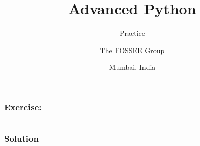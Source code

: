 \documentclass[14pt,compress]{beamer}
\title[Practice ]{Advanced Python}
\subtitle{Practice }
\author[FOSSEE] {The FOSSEE Group}
\institute[IIT Bombay] {Department of Aerospace Engineering\\IIT Bombay}
\date[] {Mumbai, India}
\begin{document}
\begin{frame}
  \titlepage
\end{frame}

\begin{frame}
  \frametitle{Exercise: }
  \begin{block}{}
  \end{block}

\begin{lstlisting}
\end{lstlisting}
\end{frame}


\begin{frame}
  \frametitle{Solution}
\begin{lstlisting}

\end{lstlisting}
\end{frame}
\end{document}
